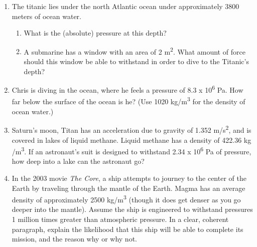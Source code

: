\documentclass[letterpaper, 11pt]{article}
\begin{document}
\begin{enumerate}
	\item The titanic lies under the north Atlantic ocean under approximately 3800 meters of ocean water.
	\begin{enumerate}
		\item What is the (absolute) pressure at this depth? 
		\vspace{0.75 in}
		
		
		\item A submarine has a window with an area of 2 m\textsuperscript{2}.  What amount of force should this window be able to withstand in order to dive to the Titanic's depth?  
			\vspace{0.75 in}
	
	\end{enumerate}

\newpage
	\item Chris is diving in the ocean, where he feels a pressure of 8.3 x 10\textsuperscript{6} Pa.  How far below the surface of the ocean is he?  (Use 1020 kg/m\textsuperscript{3} for the density of ocean water.)
	\vspace{1.5in}
	
	
	\item Saturn's moon, Titan has an acceleration due to gravity of 1.352 m/s\textsuperscript{2}, and is covered in lakes of liquid methane.  Liquid methane has a density of 422.36 kg /m\textsuperscript{3}.  If an astronaut's suit is designed to withstand 2.34 x 10\textsuperscript{6} Pa of pressure, how deep into a lake can the astronaut go?
	
	\vspace{1.5in}
	
	\item In the 2003 movie \textit{The Core}, a ship attempts to journey to the center of the Earth by traveling through the mantle of the Earth.  Magma has an average density of approximately 2500 kg/m\textsuperscript{3} (though it does get denser as you go deeper into the mantle).  Assume the ship is engineered to withstand pressures 1 million times greater than atmospheric pressure. In a clear, coherent paragraph, explain the likelihood that this ship will be able to complete its mission, and the reason why or why not.  


	 

\end{enumerate}

 

 


 
	
\end{document}
